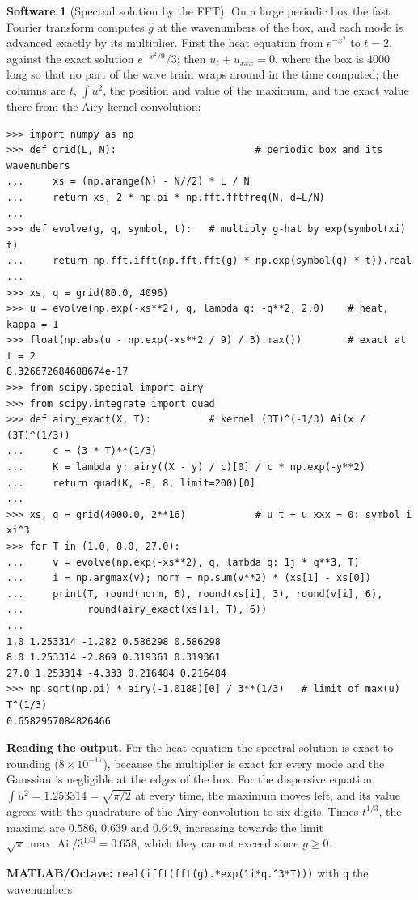 \documentclass[11pt,a4paper]{article}
\numberwithin{equation}{section}
\theoremstyle{definition}
\newtheorem{software}[thm]{Software}
\begin{document}
\begin{software}[Spectral solution by the FFT]
\label{sw:spectral}
On a large periodic box the fast Fourier transform computes $\hat g$ at the wavenumbers of the box, and each mode is advanced exactly by its multiplier. First the heat equation from $e^{-x^2}$ to $t = 2$, against the exact solution $e^{-x^2/9}/3$; then $u_t + u_{xxx} = 0$, where the box is $4000$ long so that no part of the wave train
wraps around in the time computed; the columns are $t$, $\int u^2$, the position and value of the maximum, and the exact value there from the Airy-kernel convolution:
{\small\begin{verbatim}
>>> import numpy as np
>>> def grid(L, N):                        # periodic box and its wavenumbers
...     xs = (np.arange(N) - N//2) * L / N
...     return xs, 2 * np.pi * np.fft.fftfreq(N, d=L/N)
...
>>> def evolve(g, q, symbol, t):   # multiply g-hat by exp(symbol(xi) t)
...     return np.fft.ifft(np.fft.fft(g) * np.exp(symbol(q) * t)).real
...
>>> xs, q = grid(80.0, 4096)
>>> u = evolve(np.exp(-xs**2), q, lambda q: -q**2, 2.0)    # heat, kappa = 1
>>> float(np.abs(u - np.exp(-xs**2 / 9) / 3).max())        # exact at t = 2
8.326672684688674e-17
>>> from scipy.special import airy
>>> from scipy.integrate import quad
>>> def airy_exact(X, T):          # kernel (3T)^(-1/3) Ai(x / (3T)^(1/3))
...     c = (3 * T)**(1/3)
...     K = lambda y: airy((X - y) / c)[0] / c * np.exp(-y**2)
...     return quad(K, -8, 8, limit=200)[0]
...
>>> xs, q = grid(4000.0, 2**16)            # u_t + u_xxx = 0: symbol i xi^3
>>> for T in (1.0, 8.0, 27.0):
...     v = evolve(np.exp(-xs**2), q, lambda q: 1j * q**3, T)
...     i = np.argmax(v); norm = np.sum(v**2) * (xs[1] - xs[0])
...     print(T, round(norm, 6), round(xs[i], 3), round(v[i], 6),
...           round(airy_exact(xs[i], T), 6))
...
1.0 1.253314 -1.282 0.586298 0.586298
8.0 1.253314 -2.869 0.319361 0.319361
27.0 1.253314 -4.333 0.216484 0.216484
>>> np.sqrt(np.pi) * airy(-1.0188)[0] / 3**(1/3)   # limit of max(u) T^(1/3)
0.6582957084826466
\end{verbatim}}
\textbf{Reading the output.} For the heat equation the spectral solution is exact to rounding ($8 \times 10^{-17}$), because the multiplier is exact for every mode and the Gaussian is negligible at the edges of the box. For the dispersive equation, $\int u^2 = 1.253314 = \sqrt{\pi/2}$ at every time, the maximum moves left, and its
value agrees with the quadrature of the Airy convolution to six digits. Times $t^{1/3}$, the maxima are $0.586$, $0.639$ and $0.649$, increasing towards the limit $\sqrt\pi\,\max\operatorname{Ai}/3^{1/3} = 0.658$, which they cannot exceed since $g \geq 0$.

\textbf{MATLAB/Octave:} \texttt{real(ifft(fft(g).*exp(1i*q.\^{}3*T)))} with \texttt{q} the wavenumbers.
\end{software}
\end{document}
